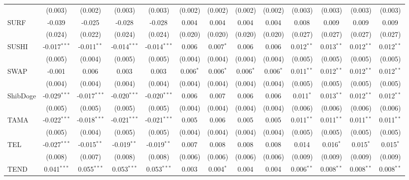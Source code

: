 \begin{table}[!htbp]
\begin{tabular}{@{\extracolsep{5pt}}lcccccccccccc}
  & (0.003) & (0.002) & (0.003) & (0.003) & (0.002) & (0.002) & (0.002) & (0.002) & (0.003) & (0.003) & (0.003) & (0.003) \\
 SURF & -0.039$^{}$ & -0.025$^{}$ & -0.028$^{}$ & -0.028$^{}$ & 0.004$^{}$ & 0.004$^{}$ & 0.004$^{}$ & 0.004$^{}$ & 0.008$^{}$ & 0.009$^{}$ & 0.009$^{}$ & 0.009$^{}$ \\
  & (0.024) & (0.022) & (0.024) & (0.024) & (0.020) & (0.020) & (0.020) & (0.020) & (0.027) & (0.027) & (0.027) & (0.027) \\
 SUSHI & -0.017$^{***}$ & -0.011$^{**}$ & -0.014$^{***}$ & -0.014$^{***}$ & 0.006$^{}$ & 0.007$^{*}$ & 0.006$^{}$ & 0.006$^{}$ & 0.012$^{**}$ & 0.013$^{**}$ & 0.012$^{**}$ & 0.012$^{**}$ \\
  & (0.005) & (0.004) & (0.005) & (0.005) & (0.004) & (0.004) & (0.004) & (0.004) & (0.005) & (0.005) & (0.005) & (0.005) \\
 SWAP & -0.001$^{}$ & 0.006$^{}$ & 0.003$^{}$ & 0.003$^{}$ & 0.006$^{*}$ & 0.006$^{*}$ & 0.006$^{*}$ & 0.006$^{*}$ & 0.011$^{**}$ & 0.012$^{**}$ & 0.012$^{**}$ & 0.012$^{**}$ \\
  & (0.004) & (0.004) & (0.004) & (0.004) & (0.004) & (0.004) & (0.004) & (0.004) & (0.005) & (0.005) & (0.005) & (0.005) \\
 ShibDoge & -0.029$^{***}$ & -0.017$^{***}$ & -0.020$^{***}$ & -0.020$^{***}$ & 0.006$^{}$ & 0.007$^{}$ & 0.006$^{}$ & 0.006$^{}$ & 0.011$^{*}$ & 0.013$^{**}$ & 0.012$^{**}$ & 0.012$^{**}$ \\
  & (0.005) & (0.005) & (0.005) & (0.005) & (0.004) & (0.004) & (0.004) & (0.004) & (0.006) & (0.006) & (0.006) & (0.006) \\
 TAMA & -0.022$^{***}$ & -0.018$^{***}$ & -0.021$^{***}$ & -0.021$^{***}$ & 0.005$^{}$ & 0.006$^{}$ & 0.005$^{}$ & 0.005$^{}$ & 0.011$^{**}$ & 0.011$^{**}$ & 0.011$^{**}$ & 0.011$^{**}$ \\
  & (0.005) & (0.004) & (0.005) & (0.005) & (0.004) & (0.004) & (0.004) & (0.004) & (0.005) & (0.005) & (0.005) & (0.005) \\
 TEL & -0.027$^{***}$ & -0.015$^{**}$ & -0.019$^{**}$ & -0.019$^{**}$ & 0.007$^{}$ & 0.008$^{}$ & 0.008$^{}$ & 0.008$^{}$ & 0.014$^{}$ & 0.016$^{*}$ & 0.015$^{*}$ & 0.015$^{*}$ \\
  & (0.008) & (0.007) & (0.008) & (0.008) & (0.006) & (0.006) & (0.006) & (0.006) & (0.009) & (0.009) & (0.009) & (0.009) \\
 TEND & 0.041$^{***}$ & 0.055$^{***}$ & 0.053$^{***}$ & 0.053$^{***}$ & 0.003$^{}$ & 0.004$^{*}$ & 0.004$^{}$ & 0.004$^{}$ & 0.006$^{**}$ & 0.008$^{**}$ & 0.008$^{**}$ & 0.008$^{**}$ \\

\end{tabular}
\end{table}
